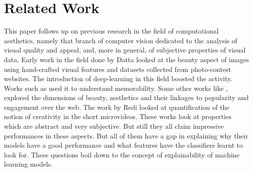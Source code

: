 \section{Related Work}




This paper follows up on previous research in the field of computational aesthetics, namely that branch of computer vision dedicated to the analysis of visual quality and appeal, and, more in general, of subjective properties of visual data.
Early work in the field done by Datta \cite{datta2008algorithmic} looked at the beauty aspect of images using hand-crafted visual features and datasets collected from photo-contest websites. The introduction of deep-learning in this field boosted the activity. Works such as \cite{Isola2011} used it to understand memorability. Some other works like \cite{khosla2014makes,Wang:2015:USA:2832415.2832579,schifanella2015image} , explored the dimensions of beauty, aesthetics and their linkages to popularity and engagement over the web. The work by Redi \cite{redi20146} looked at quantification of the notion of creativity in the short microvideos. These works look at properties which are abstract and very subjective. But still they all claim impressive performances in these aspects. But all of them have a gap in explaining why their models have a good performance and what features have the classifiers learnt to look for. These questions boil down to the concept of explainability of machine learning models. 

